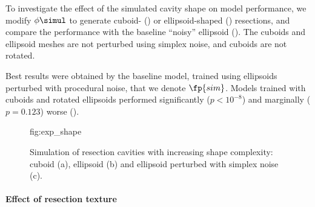 To investigate the effect of the simulated cavity shape on model performance, we modify $\phi\simul$ to generate cuboid- () or ellipsoid-shaped () resections, and compare the performance with the baseline ``noisy'' ellipsoid ().
The cuboids and ellipsoid meshes are not perturbed using simplex noise, and cuboids are not rotated.


Best results were obtained by the baseline model, trained using ellipsoids perturbed with procedural noise, that we denote $\fp{sim}$.
Models trained with cuboids and rotated ellipsoids performed significantly ($p < 10^{-8}$) and marginally ($p = 0.123$) worse ().




\begin{figure}
    \centering
    \floatconts
    {fig:exp_shape}
    {\caption{%
        Simulation of resection cavities with increasing shape complexity:
        cuboid (a),
        ellipsoid (b)
        and ellipsoid perturbed with simplex noise (c).
    }}
    {
    }
\end{figure}



\paragraph{Effect of resection texture}

